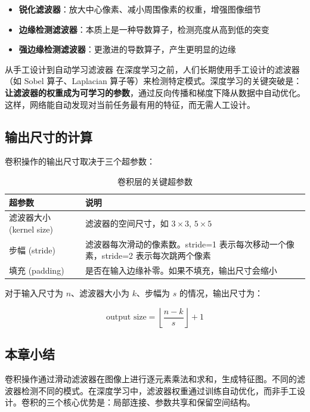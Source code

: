 \documentclass[a4paper]{article}
\begin{document}
\begin{itemize}
    \item \textbf{锐化滤波器}：放大中心像素、减小周围像素的权重，增强图像细节
    \item \textbf{边缘检测滤波器}：本质上是一种导数算子，检测亮度从高到低的突变
    \item \textbf{强边缘检测滤波器}：更激进的导数算子，产生更明显的边缘
\end{itemize}

\begin{knowledgebox}{从手工设计到自动学习滤波器}
在深度学习之前，人们长期使用手工设计的滤波器（如 Sobel 算子、Laplacian 算子等）来检测特定模式。深度学习的关键突破是：\textbf{让滤波器的权重成为可学习的参数}，通过反向传播和梯度下降从数据中自动优化。这样，网络能自动发现对当前任务最有用的特征，而无需人工设计。
\end{knowledgebox}

\subsection{输出尺寸的计算}

卷积操作的输出尺寸取决于三个超参数：

\begin{table}[H]
\centering
\begin{tabular}{lp{10cm}}
\toprule
\textbf{超参数} & \textbf{说明} \\
\midrule
滤波器大小 (kernel size) & 滤波器的空间尺寸，如 $3 \times 3$, $5 \times 5$ \\
步幅 (stride) & 滤波器每次滑动的像素数。stride=1 表示每次移动一个像素，stride=2 表示每次跳两个像素 \\
填充 (padding) & 是否在输入边缘补零。如果不填充，输出尺寸会缩小 \\
\bottomrule
\end{tabular}
\caption{卷积层的关键超参数}
\end{table}

对于输入尺寸为 $n$、滤波器大小为 $k$、步幅为 $s$ 的情况，输出尺寸为：

$$\text{output size} = \left\lfloor \frac{n - k}{s} \right\rfloor + 1$$

\subsection{本章小结}

卷积操作通过滑动滤波器在图像上进行逐元素乘法和求和，生成特征图。不同的滤波器检测不同的模式。在深度学习中，滤波器权重通过训练自动优化，而非手工设计。卷积的三个核心优势是：局部连接、参数共享和保留空间结构。
\end{document}
